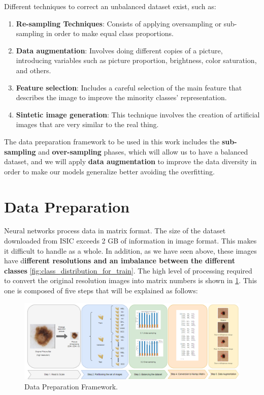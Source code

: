 Different techniques to correct an unbalanced dataset exist, such as: 
\begin{enumerate}
    \item \textbf{Re-sampling Techniques}: Consists of applying oversampling or sub-sampling in order to make equal class proportions.    
    \item \textbf{Data augmentation}: Involves doing different copies of a picture, introducing variables such as picture proportion, brightness, color saturation, and others.
    \item \textbf{Feature selection}: Includes a careful selection of the main feature that describes the image to improve the minority classes' representation.
    \item \textbf{Sintetic image generation}: This technique involves the creation of artificial images that are very similar to the real thing.  

\end{enumerate}

The data preparation framework to be used in this work includes the \textbf{sub-sampling} and \textbf{over-sampling} phases, which will allow us to have a balanced dataset, and we will apply \textbf{data augmentation} to improve the data diversity in order to make our models generalize better avoiding the overfitting.

     
\section{Data Preparation}
Neural networks process data in matrix format.  The size of the dataset downloaded from ISIC exceeds 2 GB of information in image format. This makes it difficult to handle as a whole. In addition, as we have seen above, these images have d\textbf{ifferent resolutions and an imbalance between the different classes} \ref{fig:class_distribution_for_train}. The high level of processing required to convert the original resolution images into matrix numbers is shown in \ref{fig: Data preparation steps}. This one is composed of five steps that will be explained as follows:

\begin{figure}[ht]
    \begin{center}
        \includegraphics[scale=0.50]{images/Data_Preparation/TFM_DataPreparation_Image.png}
        \caption{Data Preparation Framework.}
    \label{fig: Data preparation steps}    
    \end{center}
\end{figure}

